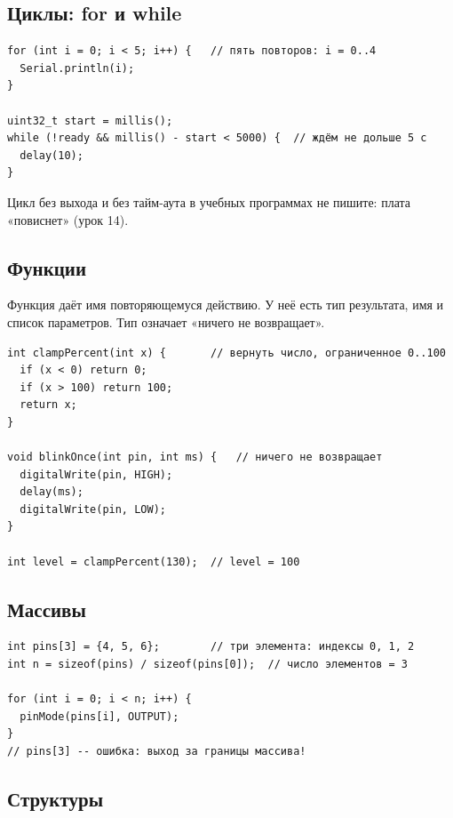 \subsection*{Циклы: for и while}

\begin{Verbatim}[fontsize=\small,bgcolor=codebg]
for (int i = 0; i < 5; i++) {   // пять повторов: i = 0..4
  Serial.println(i);
}

uint32_t start = millis();
while (!ready && millis() - start < 5000) {  // ждём не дольше 5 с
  delay(10);
}
\end{Verbatim}

Цикл  без выхода и без тайм-аута в учебных программах не пишите: плата «повиснет» (урок 14).

\subsection*{Функции}

Функция даёт имя повторяющемуся действию. У неё есть тип результата, имя и список параметров.
Тип  означает «ничего не возвращает».

\begin{Verbatim}[fontsize=\small,bgcolor=codebg]
int clampPercent(int x) {       // вернуть число, ограниченное 0..100
  if (x < 0) return 0;
  if (x > 100) return 100;
  return x;
}

void blinkOnce(int pin, int ms) {   // ничего не возвращает
  digitalWrite(pin, HIGH);
  delay(ms);
  digitalWrite(pin, LOW);
}

int level = clampPercent(130);  // level = 100
\end{Verbatim}

\subsection*{Массивы}

\begin{Verbatim}[fontsize=\small,bgcolor=codebg]
int pins[3] = {4, 5, 6};        // три элемента: индексы 0, 1, 2
int n = sizeof(pins) / sizeof(pins[0]);  // число элементов = 3

for (int i = 0; i < n; i++) {
  pinMode(pins[i], OUTPUT);
}
// pins[3] -- ошибка: выход за границы массива!
\end{Verbatim}

\subsection*{Структуры}

